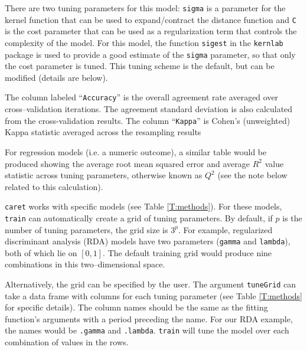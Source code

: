 \documentclass[12pt]{article}
\begin{document}
There are two tuning parameters for this model: \texttt{sigma} is a parameter for the kernel function that can be used to expand/contract the distance function and \texttt{C} is the cost parameter that can be used as a regularization term that controls the complexity of the model. For this model, the function \texttt{sigest} in the \texttt{kernlab} package is used to provide a good estimate of the \texttt{sigma} parameter, so that only the cost parameter is tuned. This tuning scheme is the default, but can be modified (details are below). 

The column labeled ``\texttt{Accuracy}'' is the overall agreement rate averaged over cross--validation iterations. The agreement standard deviation is also calculated from the cross-validation results. The column ``\texttt{Kappa}'' is Cohen's (unweighted) Kappa statistic  averaged across the resampling results


For regression models (i.e. a numeric outcome), a similar table would be produced showing the average root mean squared error and average $R^2$ value statistic across tuning parameters, otherwise known as $Q^2$ (see the note below related to this calculation).

\texttt{caret} works with specific models (see Table \ref{T:methods}). For these models, \texttt{train} can automatically create a grid of tuning parameters. By default, if $p$ is the number of tuning parameters, the grid size is $3^p$. For example, regularized discriminant analysis (RDA) models have two  parameters (\texttt{gamma} and \texttt{lambda}), both of which lie on $[0, 1]$. The default training grid would produce nine combinations in this two--dimensional space.

Alternatively, the grid can be specified by the user. The argument \texttt{tuneGrid} can take a data frame with columns for each tuning parameter (see Table \ref{T:methods} for specific details). The column names should be the same as the fitting function's arguments with a period preceding the name. For our RDA example, the names would be \texttt{.gamma} and \texttt{.lambda}. \texttt{train} will tune the model over each combination of values in the rows.
\end{document}
